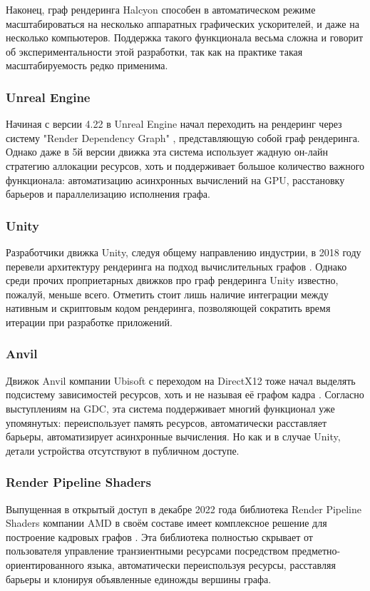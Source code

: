 Наконец, граф рендеринга Halcyon способен в автоматическом режиме масштабироваться на несколько аппаратных графических ускорителей, и даже на несколько компьютеров.
Поддержка такого функционала весьма сложна и говорит об экспериментальности этой разработки, так как на практике такая масштабируемость редко применима.

\subsubsection*{Unreal Engine}
Начиная с версии 4.22 в Unreal Engine начал переходить на рендеринг через систему "Render Dependency Graph" \cite{UERenderDependencyGraph}, представляющую собой граф рендеринга.
Однако даже в 5й версии движка эта система использует жадную он-лайн стратегию аллокации ресурсов, хоть и поддерживает большое количество важного функционала: автоматизацию асинхронных вычислений на GPU, расстановку барьеров и параллелизацию исполнения графа.

\subsubsection*{Unity}
Разработчики движка Unity, следуя общему направлению индустрии, в 2018 году перевели архитектуру рендеринга на подход вычислительных графов \cite{UnityRenderingArchitectureTalk}.
Однако среди прочих проприетарных движков про граф рендеринга Unity известно, пожалуй, меньше всего.
Отметить стоит лишь наличие интеграции между нативным и скриптовым кодом рендеринга, позволяющей сократить время итерации при разработке приложений.

\subsubsection*{Anvil}
Движок Anvil компании Ubisoft с переходом на DirectX12 тоже начал выделять подсистему зависимостей ресурсов, хоть и не называя её графом кадра \cite{DX12CaseStudies, AnvilDx12LessonsLearned}.
Согласно выступлениям на GDC, эта система поддерживает многий функционал уже упомянутых: переиспользует память ресурсов, автоматически расставляет барьеры, автоматизирует асинхронные вычисления.
Но как и в случае Unity, детали устройства отсутствуют в публичном доступе.

\subsubsection*{Render Pipeline Shaders}
Выпущенная в открытый доступ \cite{RPSgithub} в декабре 2022 года библиотека Render Pipeline Shaders компании AMD в своём составе имеет комплексное решение для построение кадровых графов \cite{RPSpost}.
Эта библиотека полностью скрывает от пользователя управление транзиентными ресурсами посредством предметно-ориентированного языка, автоматически переиспользуя ресурсы, расставляя барьеры и клонируя объявленные единожды вершины графа.

